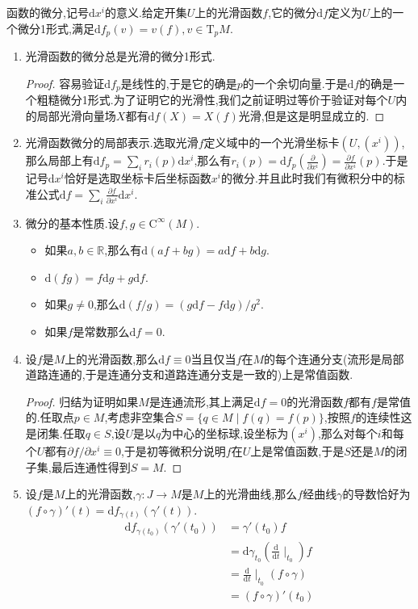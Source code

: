 函数的微分,记号$\mathrm{d}x^i$的意义.给定开集$U$上的光滑函数$f$,它的微分$\mathrm{d}f$定义为$U$上的一个微分1形式,满足$\mathrm{d}f_p(v)=v(f),v\in\mathrm{T}_pM$.
\begin{enumerate}
	\item 光滑函数的微分总是光滑的微分1形式.
	\begin{proof}
		
		容易验证$\mathrm{d}f_p$是线性的,于是它的确是$p$的一个余切向量.于是$\mathrm{d}f$的确是一个粗糙微分1形式.为了证明它的光滑性,我们之前证明过等价于验证对每个$U$内的局部光滑向量场$X$都有$\mathrm{d}f(X)=X(f)$光滑,但是这是明显成立的.
	\end{proof}
    \item 光滑函数微分的局部表示.选取光滑$f$定义域中的一个光滑坐标卡$(U,(x^i))$,那么局部上有$\mathrm{d}f_p=\sum_ir_i(p)\mathrm{d}x^i$,那么有$r_i(p)=\mathrm{d}f_p\left(\frac{\partial}{\partial x^i}\right)=\frac{\partial f}{\partial x^i}(p)$.于是记号$\mathrm{d}x^i$恰好是选取坐标卡后坐标函数$x^i$的微分.并且此时我们有微积分中的标准公式$\mathrm{d}f=\sum_i\frac{\partial f}{\partial x^i}\mathrm{d}x^i$.
    \item 微分的基本性质.设$f,g\in\mathrm{C}^{\infty}(M)$.
    \begin{itemize}
    	\item 如果$a,b\in\mathbb{R}$,那么有$\mathrm{d}(af+bg)=a\mathrm{d}f+b\mathrm{d}g$.
    	\item $\mathrm{d}(fg)=f\mathrm{d}g+g\mathrm{d}f$.
    	\item 如果$g\not=0$,那么$\mathrm{d}(f/g)=(g\mathrm{d}f-f\mathrm{d}g)/g^2$.
    	\item 如果$f$是常数那么$\mathrm{d}f=0$.
    \end{itemize}
    \item 设$f$是$M$上的光滑函数,那么$\mathrm{d}f\equiv0$当且仅当$f$在$M$的每个连通分支(流形是局部道路连通的,于是连通分支和道路连通分支是一致的)上是常值函数.
    \begin{proof}
    	
    	归结为证明如果$M$是连通流形,其上满足$\mathrm{d}f=0$的光滑函数$f$都有$f$是常值的.任取点$p\in M$,考虑非空集合$S=\{q\in M\mid f(q)=f(p)\}$,按照$f$的连续性这是闭集.任取$q\in S$,设$U$是以$q$为中心的坐标球,设坐标为$(x^i)$,那么对每个$i$和每个$U$都有$\partial f/\partial x^i\equiv0$,于是初等微积分说明$f$在$U$上是常值函数,于是$S$还是$M$的闭子集,最后连通性得到$S=M$.
    \end{proof}
    \item 设$f$是$M$上的光滑函数,$\gamma:J\to M$是$M$上的光滑曲线,那么$f$经曲线$\gamma$的导数恰好为$(f\circ\gamma)'(t)=\mathrm{d}f_{\gamma(t)}(\gamma'(t))$.
    \begin{align*}
    \mathrm{d}f_{\gamma(t_0)}(\gamma'(t_0))&=\gamma'(t_0)f\\&=\mathrm{d}\gamma_{t_0}\left(\frac{\mathrm{d}}{\mathrm{d}t}\mid_{t_0}\right)f\\&=\frac{\mathrm{d}}{\mathrm{d}t}\mid_{t_0}(f\circ\gamma)\\&=(f\circ\gamma)'(t_0)
    \end{align*}
\end{enumerate}

